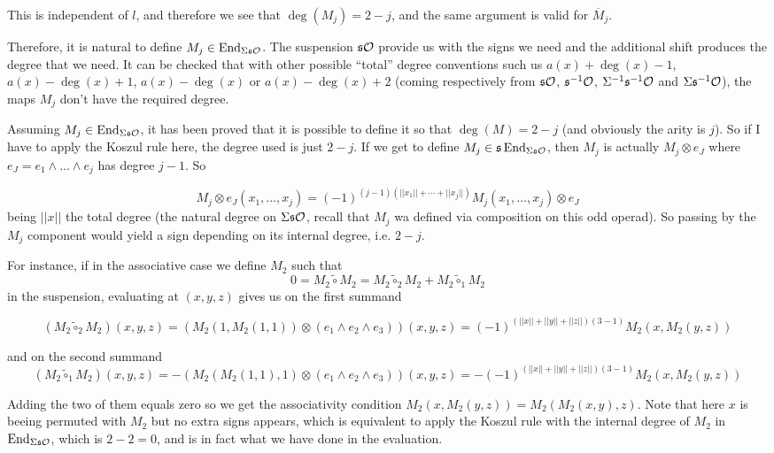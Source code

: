 \documentclass[twoside]{article}
\begin{document}
\begin{appendices}
This is independent of $l$, and therefore we see that $\deg(M_j)=2-j$, and the same argument is valid for $\overline{M}_j$.

Therefore, it is natural to define $M_j\in\operatorname{End}_{\Sigma\mathfrak{s}{\mathcal O}}$. The suspension $\mathfrak{s}{\mathcal O}$ provide us with the signs we need and the additional shift produces the degree that we need. It can be checked that with other possible ``total'' degree conventions such us $a(x)+\deg(x)-1$, $a(x)-\deg(x)+1$, $a(x)-\deg(x)$ or $a(x)-\deg(x)+2$ (coming respectively from $\mathfrak{s}{\mathcal O}$, $\mathfrak{s}^{-1}{\mathcal O}$, $\Sigma^{-1}\mathfrak{s}^{-1}{\mathcal O}$ and $\Sigma\mathfrak{s}^{-1}{\mathcal O}$), the maps $M_j$ don't have the required degree.

\begin{remark}\label{remark3}


Assuming $M_j\in \operatorname{End}_{\Sigma\mathfrak{s}{\mathcal O}}$, it has been proved that it is possible to define it so that $\deg(M)=2-j$ (and obviously the arity is $j$). So if I have to apply the Koszul rule here, the degree used is just $2-j$. If we get to define $M_j\in\mathfrak{s}\operatorname{End}_{\Sigma\mathfrak{s}{\mathcal O}}$, then $M_j$ is actually $M_j\otimes e_J$ where $e_J=e_1\land\dots\land e_j$ has degree $j-1$. So 

$$M_j\otimes e_J(x_1,\dots, x_j)=(-1)^{(j-1)(||x_1||+\cdots+||x_j||)}M_j(x_1,\dots, x_j)\otimes e_J$$
being $||x||$ the total degree (the natural degree on $\Sigma\mathfrak{s}{\mathcal O}$, recall that $M_j$ wa defined via composition on this odd operad). So passing by the $M_j$ component would yield a sign depending on its internal degree, i.e. $2-j$.

For instance, if in the associative case we define $M_2$ such that $$0=M_2\tilde{\circ}M_2=M_2\tilde{\circ}_2 M_2+M_2\tilde{\circ}_1 M_2$$ in the suspension, evaluating at $(x,y,z)$ gives us on the first summand

$$(M_2\tilde{\circ}_2M_2)(x,y,z)=(M_2(1,M_2(1,1))\otimes (e_1\land e_2\land e_3))(x,y,z)=(-1)^{(||x||+||y||+||z||)(3-1)}M_2(x,M_2(y,z))$$

and on the second summand
$$(M_2\tilde{\circ}_1M_2)(x,y,z)=-(M_2(M_2(1,1),1)\otimes (e_1\land e_2\land e_3))(x,y,z)=-(-1)^{(||x||+||y||+||z||)(3-1)}M_2(x,M_2(y,z))$$

Adding the two of them equals zero so we get the associativity condition $M_2(x,M_2(y,z))=M_2(M_2(x,y),z)$. Note that here $x$ is beeing permuted with $M_2$ but no extra signs appears, which is equivalent to apply the Koszul rule with the internal degree of $M_2$ in $\operatorname{End}_{\Sigma\mathfrak{s}{\mathcal O}}$, which is $2-2=0$, and is in fact what we have done in the evaluation.

\end{remark}
\end{appendices}
\end{document}
